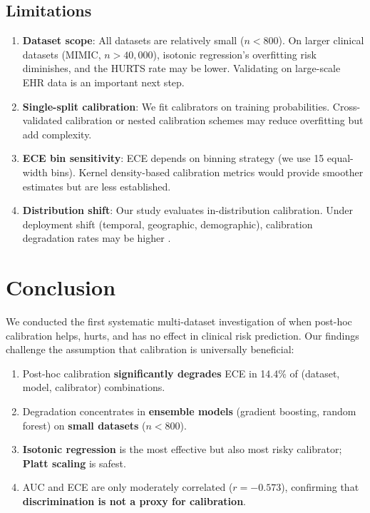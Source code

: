 \documentclass[preprint,12pt]{elsarticle}
\begin{document}
\subsection{Limitations}

\begin{enumerate}
    \item \textbf{Dataset scope}: All datasets are relatively small ($n<800$). On larger clinical datasets (MIMIC, $n>40{,}000$), isotonic regression's overfitting risk diminishes, and the HURTS rate may be lower. Validating on large-scale EHR data is an important next step.
    \item \textbf{Single-split calibration}: We fit calibrators on training probabilities. Cross-validated calibration or nested calibration schemes may reduce overfitting but add complexity.
    \item \textbf{ECE bin sensitivity}: ECE depends on binning strategy (we use 15 equal-width bins). Kernel density-based calibration metrics would provide smoother estimates but are less established.
    \item \textbf{Distribution shift}: Our study evaluates in-distribution calibration. Under deployment shift (temporal, geographic, demographic), calibration degradation rates may be higher \citep{rethinking2024}.
\end{enumerate}

\section{Conclusion}
\label{sec:conclusion}

We conducted the first systematic multi-dataset investigation of when post-hoc calibration helps, hurts, and has no effect in clinical risk prediction. Our findings challenge the assumption that calibration is universally beneficial:

\begin{enumerate}
    \item Post-hoc calibration \textbf{significantly degrades} ECE in 14.4\% of (dataset, model, calibrator) combinations.
    \item Degradation concentrates in \textbf{ensemble models} (gradient boosting, random forest) on \textbf{small datasets} ($n<800$).
    \item \textbf{Isotonic regression} is the most effective but also most risky calibrator; \textbf{Platt scaling} is safest.
    \item AUC and ECE are only moderately correlated ($r=-0.573$), confirming that \textbf{discrimination is not a proxy for calibration}.
\end{enumerate}
\end{document}
